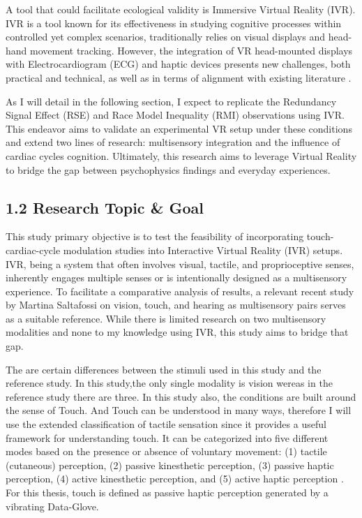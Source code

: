 \documentclass[12pt,oneside,openright]{report}
\begin{document}
A tool that could facilitate ecological validity is Immersive Virtual Reality (IVR). IVR is a tool known for its effectiveness in studying cognitive processes within controlled yet complex scenarios, traditionally relies on visual displays and head-hand movement tracking. However, the integration of VR head-mounted displays with Electrocardiogram (ECG) and haptic devices presents new challenges, both practical and technical, as well as in terms of alignment with existing literature \parencite{Klotzsche2023}.

As I will detail in the following section, I expect to replicate the Redundancy Signal Effect (RSE) and Race Model Inequality (RMI) observations using IVR. This endeavor aims to validate an experimental VR setup under these conditions and extend two lines of research: multisensory integration and the influence of cardiac cycles cognition. Ultimately, this research aims to leverage Virtual Reality to bridge the gap between psychophysics findings and everyday experiences.

\subsection*{1.2 Research Topic \& Goal}

This study primary objective is to test the feasibility of incorporating touch-cardiac-cycle modulation studies into Interactive Virtual Reality (IVR) setups. IVR, being a system that often involves visual, tactile, and proprioceptive senses, inherently engages multiple senses or is intentionally designed as a multisensory experience. To facilitate a comparative analysis of results, a relevant recent study by Martina Saltafossi on vision, touch, and hearing as multisensory pairs \parencite{SALTAFOSSI2023108642} serves as a suitable reference. While there is limited research on two multisensory modalities and none to my knowledge using IVR, this study aims to bridge that gap. 

The are certain differences between the stimuli used in this study and the reference study. In this study,the only single modality is vision wereas in the reference study there are three. In this study also, the conditions are built around the sense of Touch. And Touch can be understood in many ways, therefore I will use the extended classification of tactile sensation since it provides a useful framework for understanding touch. It can be categorized into five different modes based on the presence or absence of voluntary movement: (1) tactile (cutaneous) perception, (2) passive kinesthetic perception, (3) passive haptic perception, (4) active kinesthetic perception, and (5) active haptic perception \parencite{Healy2003HandbookOP}. For this thesis, touch is defined as passive haptic perception generated by a vibrating Data-Glove.
\end{document}
